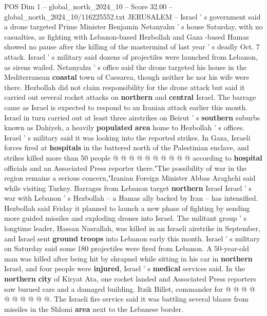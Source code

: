 \begin{textsample}{POS Dim 1 – global\_north\_2024\_10 – Score 32.00 – global\_north\_2024\_10/116225552.txt}  \label{ex:f1_pos_375}
JERUSALEM -- Israel ' s government said a drone targeted Prime Minister Benjamin Netanyahu ' s house Saturday, with no casualties, as fighting with Lebanon-based Hezbollah and Gaza -based Hamas showed no pause after the killing of the mastermind of last year ' s deadly Oct. 7 attack.
Israel ' s military said dozens of projectiles were launched from Lebanon, as sirens wailed.
Netanyahu ' s office said the drone targeted his house in the Mediterranean \textbf{coastal} town of Caesarea, though neither he nor his wife were there.
Hezbollah did not claim responsibility for the drone attack but said it carried out several rocket attacks on \textbf{northern} and \textbf{central} Israel.
The barrage came as Israel is expected to respond to an Iranian attack earlier this month.
Israel in turn carried out at least three airstrikes on Beirut ' s \textbf{southern} suburbs known as Dahiyeh, a heavily \textbf{populated} \textbf{area} home to Hezbollah ' s offices.
Israel ' s military said it was looking into the reported strikes.
In Gaza, Israeli forces fired at \textbf{hospitals} in the battered north of the Palestinian enclave, and strikes killed more than 50 people @ @ @ @ @ @ @ @ @ @ according to \textbf{hospital} officials and an Associated Press reporter there."The possibility of war in the region remains a serious concern,"Iranian Foreign Minister Abbas Araghchi said while visiting Turkey.
Barrages from Lebanon target \textbf{northern} Israel Israel ' s war with Lebanon ' s Hezbollah -- a Hamas ally backed by Iran -- has intensified.
Hezbollah said Friday it planned to launch a new phase of fighting by sending more guided missiles and exploding drones into Israel.
The militant group ' s longtime leader, Hassan Nasrallah, was killed in an Israeli airstrike in September, and Israel sent \textbf{ground} \textbf{troops} into Lebanon early this month.
Israel ' s military on Saturday said some 180 projectiles were fired from Lebanon.
A 50-year-old man was killed after being hit by shrapnel while sitting in his car in \textbf{northern} Israel, and four people were \textbf{injured}, Israel ' s \textbf{medical} services said.
In the \textbf{northern} \textbf{city} of Kiryat Ata, one rocket landed and Associated Press reporters saw burned cars and a damaged building.
Itzik Billet, commander for @ @ @ @ @ @ @ @ @ @.
The Israeli fire service said it was battling several blazes from missiles in the Shlomi \textbf{area} next to the Lebanese border.

\end{textsample}
